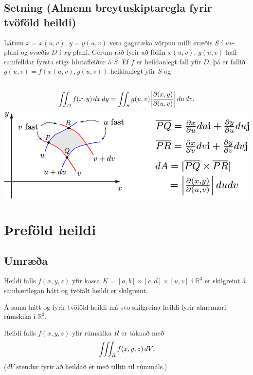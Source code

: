 \documentclass[a4paper,10pt,icelandic]{sphinxmanual}
\begin{document}
\subsection{Setning (Almenn breytuskiptaregla fyrir tvöföld heildi)}
\label{Kafli4:setning-almenn-breytuskiptaregla-fyrir-tvofold-heildi}
Látum \(x=x(u,v)\), \(y=y(u,v)\) vera gagntæka vörpun milli
svæðis \(S\) í \(uv\)-plani og svæðis \(D\) í
\(xy\)-plani. Gerum ráð fyrir að föllin \(x(u,v)\),
\(y(u,v)\) hafi samfelldar fyrsta stigs hlutafleiður á \(S\). Ef
\(f\) er heildanlegt fall yfir \(D\), þá er fallið
\(g(u,v)=f(x(u,v), y(u,v))\) heildanlegt yfir \(S\) og
\begin{gather}
\begin{split}\displaystyle\end{split}\notag\\\begin{split}\int\!\!\!\int_D f(x,y)\,dx\,dy=\int\!\!\!\int_S g(u,v)
\bigg|\frac{\partial(x,y)}{\partial(u,v)}\bigg|\,du\,dv.\end{split}\notag
\end{gather}
{\hfill\includegraphics[width=0.900\linewidth]{changevar.png}\hfill}


\section{Þreföld heildi}
\label{Kafli4:refold-heildi}

\subsection{Umræða}
\label{Kafli4:id15}
Heildi falls \(f(x,y,z)\) yfir kassa
\(K=[a,b]\times[c,d]\times[u,v]\) í \({\mathbb  R}^3\) er
skilgreint á sambærilegan hátt og tvöfalt heildi er skilgreint.

Á sama hátt og fyrir tvöföld heildi má svo skilgreina heildi fyrir
almennari rúmskika í \({\mathbb  R}^3\).

Heildi falls \(f(x,y,z)\) yfir rúmskika \(R\) er táknað með
\begin{gather}
\begin{split}\displaystyle \int\!\!\!\int\!\!\!\int_R f(x,y,z)\,dV.\end{split}\notag
\end{gather}
(\(dV\) stendur fyrir að heildað er með tilliti til rúmmáls.)
\end{document}
